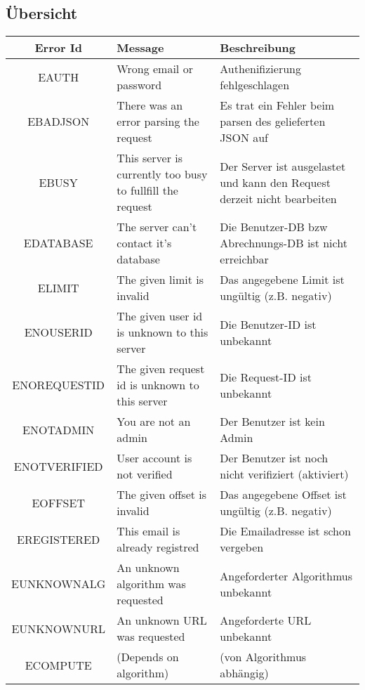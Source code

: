 \documentclass[ngerman,titlepage,parskip=true]{scrartcl}
\begin{document}
\subsection{Übersicht}
\begin{tabular}{|c|p{}|p{}|}
\hline
\textbf{Error Id}	& \textbf{Message}			& \textbf{Beschreibung} \\
\hline
EAUTH		& Wrong email or password	& Authenifizierung fehlgeschlagen \\
\hline
EBADJSON	& There was an error parsing the request & Es trat ein Fehler beim parsen des gelieferten JSON auf \\
\hline
EBUSY		& This server is currently too busy to fullfill the request	& Der Server ist ausgelastet und kann den Request derzeit nicht bearbeiten \\
\hline
EDATABASE	& The server can't contact it's database	& Die Benutzer-DB bzw Abrechnungs-DB ist nicht erreichbar \\
\hline
ELIMIT		& The given limit is invalid			& Das angegebene Limit ist ungültig (z.B. negativ) \\
\hline
ENOUSERID	& The given user id is unknown to this server	& Die Benutzer-ID ist unbekannt \\
\hline
ENOREQUESTID	& The given request id is unknown to this server	& Die Request-ID ist unbekannt \\
\hline
ENOTADMIN	& You are not an admin				& Der Benutzer ist kein Admin \\
\hline
ENOTVERIFIED	& User account is not verified	& Der Benutzer ist noch nicht verifiziert (aktiviert) \\
\hline
EOFFSET		& The given offset is invalid 			& Das angegebene Offset ist ungültig (z.B. negativ) \\
\hline
EREGISTERED	& This email is already registred	& Die Emailadresse ist schon vergeben \\
\hline
EUNKNOWNALG	& An unknown algorithm was requested	& Angeforderter Algorithmus unbekannt \\
\hline
EUNKNOWNURL	& An unknown URL was requested	& Angeforderte URL unbekannt \\
\hline
ECOMPUTE	& (Depends on algorithm)	& (von Algorithmus abhängig) \\
\hline
\end{tabular}
\end{document}
